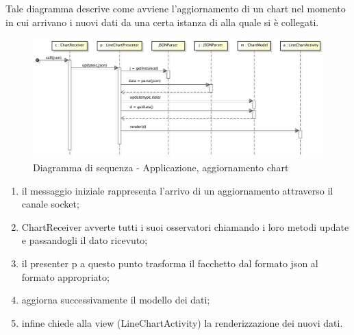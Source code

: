             Tale diagramma descrive come avviene l'aggiornamento di un chart nel momento in cui arrivano i nuovi dati da una certa istanza di  alla quale si è collegati.
            \begin{figure}[H]
                \centering
                \includegraphics[scale=0.3]{DefinizioneDiProdotto/Pics/ApplicazioneAggiornamentoChart}
                \caption{Diagramma di sequenza - Applicazione, aggiornamento chart}
            \end{figure}
            \begin{enumerate}
                \item il messaggio iniziale rappresenta l'arrivo di un aggiornamento attraverso il canale socket;
                \item ChartReceiver avverte tutti i suoi osservatori chiamando i loro metodi update e passandogli il dato ricevuto;
                \item il presenter p a questo punto trasforma il facchetto dal formato json al formato appropriato;
                \item aggiorna successivamente il modello dei dati;
                \item infine chiede alla view (LineChartActivity) la renderizzazione dei nuovi dati.
            \end{enumerate}
